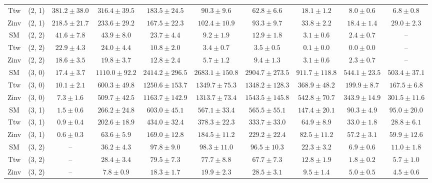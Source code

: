 \begin{table}[h!]
{\begin{tabular}{cccccccccc}
	Ttw & (2, 1) & $381.2\pm 38.0$ & $316.4\pm 39.5$ & $183.5\pm 24.5$ & $90.3\pm 9.6$ & $62.8\pm 6.6$ & $18.1\pm 1.2$ & $8.0\pm 0.6$ & $6.8\pm 0.8$ \\[0.5ex] 
	Zinv & (2, 1) & $218.5\pm 21.7$ & $233.6\pm 29.2$ & $167.5\pm 22.3$ & $102.4\pm 10.9$ & $93.3\pm 9.7$ & $33.8\pm 2.2$ & $18.4\pm 1.4$ & $29.0\pm 2.3$ \\[0.5ex] 
	SM & (2, 2) & $41.6\pm 7.8$ & $43.9\pm 8.0$ & $23.7\pm 4.4$ & $9.2\pm 1.9$ & $12.9\pm 1.8$ & $3.1\pm 0.6$ & $2.4\pm 0.7$ & -- \\[0.5ex] 
	Ttw & (2, 2) & $22.9\pm 4.3$ & $24.0\pm 4.4$ & $10.8\pm 2.0$ & $3.4\pm 0.7$ & $3.5\pm 0.5$ & $0.1\pm 0.0$ & $0.0\pm 0.0$ & -- \\[0.5ex] 
	Zinv & (2, 2) & $18.6\pm 3.5$ & $19.8\pm 3.7$ & $12.8\pm 2.4$ & $5.7\pm 1.2$ & $9.4\pm 1.3$ & $3.1\pm 0.6$ & $2.3\pm 0.7$ & -- \\[0.5ex] 
	SM & (3, 0) & $17.4\pm 3.7$ & $1110.0\pm 92.2$ & $2414.2\pm 296.5$ & $2683.1\pm 150.8$ & $2904.7\pm 273.5$ & $911.7\pm 118.8$ & $544.1\pm 23.5$ & $503.4\pm 37.1$ \\[0.5ex] 
	Ttw & (3, 0) & $10.1\pm 2.1$ & $600.3\pm 49.8$ & $1250.6\pm 153.7$ & $1349.7\pm 75.3$ & $1348.2\pm 128.3$ & $368.9\pm 48.2$ & $199.9\pm 8.7$ & $167.5\pm 6.8$ \\[0.5ex] 
	Zinv & (3, 0) & $7.3\pm 1.6$ & $509.7\pm 42.5$ & $1163.7\pm 142.9$ & $1313.7\pm 73.4$ & $1543.5\pm 145.8$ & $542.8\pm 70.7$ & $343.9\pm 14.9$ & $301.5\pm 11.6$ \\[0.5ex] 
	SM & (3, 1) & $1.5\pm 0.6$ & $266.2\pm 24.8$ & $603.0\pm 45.1$ & $567.1\pm 33.4$ & $565.5\pm 55.1$ & $147.4\pm 20.1$ & $90.3\pm 4.9$ & $95.0\pm 20.0$ \\[0.5ex] 
	Ttw & (3, 1) & $0.9\pm 0.4$ & $202.6\pm 18.9$ & $434.0\pm 32.4$ & $378.3\pm 22.3$ & $333.7\pm 33.0$ & $64.9\pm 8.9$ & $33.0\pm 1.8$ & $28.8\pm 6.1$ \\[0.5ex] 
	Zinv & (3, 1) & $0.6\pm 0.3$ & $63.6\pm 5.9$ & $169.0\pm 12.8$ & $184.5\pm 11.2$ & $229.2\pm 22.4$ & $82.5\pm 11.2$ & $57.2\pm 3.1$ & $59.9\pm 12.6$ \\[0.5ex] 
	SM & (3, 2) & -- & $36.2\pm 4.3$ & $97.8\pm 9.0$ & $98.3\pm 11.0$ & $96.5\pm 10.3$ & $22.3\pm 3.2$ & $6.9\pm 0.6$ & $11.0\pm 1.8$ \\[0.5ex] 
	Ttw & (3, 2) & -- & $28.4\pm 3.4$ & $79.5\pm 7.3$ & $77.7\pm 8.8$ & $67.7\pm 7.3$ & $12.8\pm 1.9$ & $1.8\pm 0.2$ & $5.7\pm 1.0$ \\[0.5ex] 
	Zinv & (3, 2) & -- & $7.8\pm 0.9$ & $18.3\pm 1.7$ & $19.9\pm 2.3$ & $28.5\pm 3.1$ & $9.5\pm 1.4$ & $5.0\pm 0.5$ & $4.5\pm 0.6$ \\[0.5ex] 

\end{tabular}}
\end{table}
